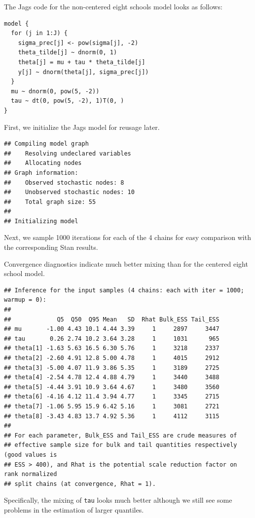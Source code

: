 \documentclass[american,]{article}
\begin{document}
The Jags code for the non-centered eight schools model looks as follows:

\begin{verbatim}
model {
  for (j in 1:J) {
    sigma_prec[j] <- pow(sigma[j], -2)
    theta_tilde[j] ~ dnorm(0, 1)
    theta[j] = mu + tau * theta_tilde[j]
    y[j] ~ dnorm(theta[j], sigma_prec[j])
  }
  mu ~ dnorm(0, pow(5, -2))
  tau ~ dt(0, pow(5, -2), 1)T(0, )
}
\end{verbatim}

First, we initialize the Jags model for reusage later.

\begin{verbatim}
## Compiling model graph
##    Resolving undeclared variables
##    Allocating nodes
## Graph information:
##    Observed stochastic nodes: 8
##    Unobserved stochastic nodes: 10
##    Total graph size: 55
## 
## Initializing model
\end{verbatim}

Next, we sample 1000 iterations for each of the 4 chains for easy
comparison with the corresponding Stan results.

Convergence diagnostics indicate much better mixing than for the
centered eight school model.

\begin{verbatim}
## Inference for the input samples (4 chains: each with iter = 1000; warmup = 0):
## 
##             Q5  Q50  Q95 Mean   SD  Rhat Bulk_ESS Tail_ESS
## mu       -1.00 4.43 10.1 4.44 3.39     1     2897     3447
## tau       0.26 2.74 10.2 3.64 3.28     1     1031      965
## theta[1] -1.63 5.63 16.5 6.30 5.76     1     3218     2337
## theta[2] -2.60 4.91 12.8 5.00 4.78     1     4015     2912
## theta[3] -5.00 4.07 11.9 3.86 5.35     1     3189     2725
## theta[4] -2.54 4.78 12.4 4.88 4.79     1     3440     3488
## theta[5] -4.44 3.91 10.9 3.64 4.67     1     3480     3560
## theta[6] -4.16 4.12 11.4 3.94 4.77     1     3345     2715
## theta[7] -1.06 5.95 15.9 6.42 5.16     1     3081     2721
## theta[8] -3.43 4.83 13.7 4.92 5.36     1     4112     3115
## 
## For each parameter, Bulk_ESS and Tail_ESS are crude measures of 
## effective sample size for bulk and tail quantities respectively (good values is 
## ESS > 400), and Rhat is the potential scale reduction factor on rank normalized
## split chains (at convergence, Rhat = 1).
\end{verbatim}

Specifically, the mixing of \texttt{tau} looks much better although we
still see some problems in the estimation of larger quantiles.
\end{document}
